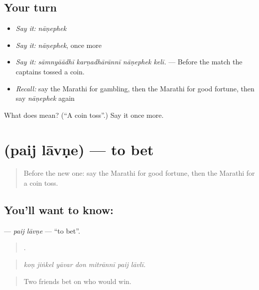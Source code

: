 \subsection*{Your turn}
\begin{itemize}
\raggedright
  \item \emph{Say it:} \emph{nāṇephek}
  \item \emph{Say it:} \emph{nāṇephek}, once more
  \item \emph{Say it:} \emph{sāmnyāādhī karṇadhārānnī nāṇephek kelī.} — Before the match the captains tossed a coin.
  \item \emph{Recall:} say the Marathi for gambling, then the Marathi for good fortune, then say \emph{nāṇephek} again
\end{itemize}

\begin{tcolorbox}[breakable,colback=teal!4,colframe=teal!35!black,title={Before you move on}]
What does  mean? (\textquotedblleft{}A coin toss\textquotedblright{}.) Say it once more.
\end{tcolorbox}
\section[\texorpdfstring{\mr{पैज} \mr{लावणे} (paij lāvṇe)}{पैज लावणे (paij lāvṇe)}]{  (paij lāvṇe) — to bet}

\label{lesson:MR-C550-paij-lavne}



\begin{quote}
Before the new one: say the Marathi for good fortune, then the Marathi for a coin toss.
\end{quote}

\subsection*{You'll want to know:  }
\textbf{ } — \emph{paij lāvṇe} — \textquotedblleft{}to bet\textquotedblright{}.

\begin{quote}
      .
\end{quote}

\begin{quote}
\emph{koṇ jiṅkel yāvar don mitrānnī paij lāvlī.}
\end{quote}

\begin{quote}
Two friends bet on who would win.
\end{quote}

